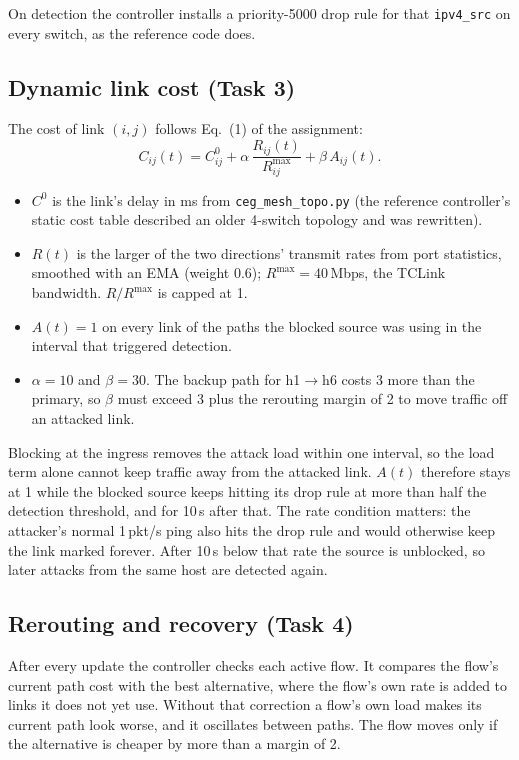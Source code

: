 \documentclass[11pt,a4paper]{article}
\newcommand{\ra}{\ensuremath{\rightarrow}}
\newcommand{\code}[1]{\texttt{#1}}
\newcommand{\Czero}{\ensuremath{C^{0}}}
\begin{document}
On detection the controller installs a priority-5000 drop rule for that \code{ipv4\_src} on every switch, as
the reference code does.

\subsection{Dynamic link cost (Task 3)}

The cost of link $(i,j)$ follows Eq.~(1) of the assignment:
\begin{equation}
  C_{ij}(t) = C^{0}_{ij} + \alpha\,\frac{R_{ij}(t)}{R^{\max}_{ij}} + \beta\,A_{ij}(t).
  \label{eq:cost}
\end{equation}
\begin{itemize}
  \item \Czero{} is the link's delay in ms from \code{ceg\_mesh\_topo.py} (the reference controller's static cost
        table described an older 4-switch topology and was rewritten).
  \item $R(t)$ is the larger of the two directions' transmit rates from port statistics, smoothed with an EMA
        (weight 0.6); $R^{\max}=40$\,Mbps, the TCLink bandwidth. $R/R^{\max}$ is capped at 1.
  \item $A(t)=1$ on every link of the paths the blocked source was using in the interval that triggered
        detection.
  \item $\alpha=10$ and $\beta=30$. The backup path for h1\ra h6 costs 3 more than the primary, so $\beta$ must
        exceed 3 plus the rerouting margin of 2 to move traffic off an attacked link.
\end{itemize}

Blocking at the ingress removes the attack load within one interval, so the load term alone cannot keep traffic
away from the attacked link. $A(t)$ therefore stays at 1 while the blocked source keeps hitting its drop rule at
more than half the detection threshold, and for 10\,s after that. The rate condition matters: the attacker's
normal 1\,pkt/s ping also hits the drop rule and would otherwise keep the link marked forever. After 10\,s below
that rate the source is unblocked, so later attacks from the same host are detected again.

\subsection{Rerouting and recovery (Task 4)}

After every update the controller checks each active flow. It compares the flow's current path cost with the
best alternative, where the flow's own rate is added to links it does not yet use. Without that correction a
flow's own load makes its current path look worse, and it oscillates between paths. The flow moves only if the
alternative is cheaper by more than a margin of 2.
\end{document}
